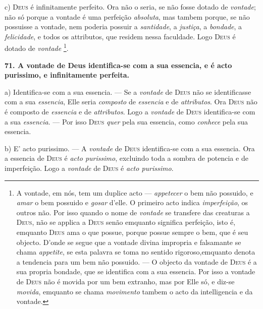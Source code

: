 c) \textsc{Deus} é infinitamente perfeito. Ora não o seria, se não fosse dotado de \emph{vontade}; não só porque a vontade é uma perfeição \emph{absoluta}, mas tambem porque, se não possuisse a vontade, nem poderia possuir a \emph{santidade}, a \emph{justiça}, a \emph{bondade}, a \emph{felicidade}, e todos os attributos, que residem nessa faculdade. Logo \textsc{Deus} é dotado de \emph{vontade} \footnote{A vontade, em nós, tem um duplice acto --- \emph{appetecer} o bem não possuido, e \emph{amar} o bem possuido e \emph{gosar} d'elle. O primeiro acto indica \emph{imperfeição}, os outros não. Por isso quando o nome de \emph{vontade} se transfere das creaturas a \textsc{Deus}, não se applica a \textsc{Deus} senão emquanto significa perfeição, isto é, emquanto \textsc{Deus} ama o que possue, porque possue sempre o bem, que é seu objecto. D'onde se segue que a vontade divina impropria e falsamante se chama \emph{appetite}, se esta palavra se toma no sentido rigoroso,emquanto denota a tendencia para um bem não possuido. --- O objecto da vontade de \textsc{Deus} é a sua propria bondade, que se identifica com a sua essencia. Por isso a vontade de \textsc{Deus} não é movida por um bem extranho, mas por Elle só, e diz-se \emph{movida}, emquanto se chama \emph{movimento} tambem o acto da intelligencia e da vontade.}.

 \textbf{71. A vontade de Deus identifica-se com a sua essencia, e é acto purissimo, e infinitamente perfeita.}

a) Identifica-se com a sua essencia. --- Se a \emph{vontade} de \textsc{Deus} não se identificasse com a sua \emph{essencia}, Elle seria \emph{composto} de \emph{essencia} e de \emph{attributos}. Ora \textsc{Deus} não é composto de \emph{essencia} e de \emph{attributos}. Logo a \emph{vontade} de \textsc{Deus} identifica-se com a sua \emph{essencia}. --- Por isso \textsc{Deus} \emph{quer} pela sua essencia, como \emph{conhece} pela sua essencia.

b) E' acto purissimo. --- A \emph{vontade} de \textsc{Deus} identifica-se com a sua essencia. Ora a essencia de \textsc{Deus} é \emph{acto purissimo}, excluindo toda a sombra de potencia e de imperfeição. Logo a \emph{vontade} de \textsc{Deus} é \emph{acto purissimo}.

